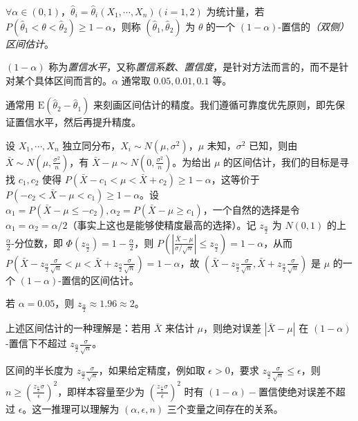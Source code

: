 \documentclass[../main.tex]{subfiles}
\begin{document}
\begin{definition}\label{def:6.4.1}
    $\forall\alpha\in(0,1)$，$\hat\theta_i=\hat\theta_i(X_1,\cdots,X_n)(i=1,2)$ 为统计量，若 $P(\hat\theta_1<\theta<\hat\theta_2)\geq1-\alpha$，则称 $(\hat\theta_1,\hat\theta_2)$ 为 $\theta$ 的一个 $(1-\alpha)$-置信的\emph{（双侧）区间估计}。
\end{definition}

$(1-\alpha)$ 称为\emph{置信水平}，又称\emph{置信系数}、\emph{置信度}，是针对方法而言的，而不是针对某个具体区间而言的。$\alpha$ 通常取 $0.05,0.01,0.1$ 等。

通常用 $\mathrm E(\hat\theta_2-\hat\theta_1)$ 来刻画区间估计的精度。我们遵循可靠度优先原则，即先保证置信水平，然后再提升精度。

\begin{example}
    设 $X_1,\cdots,X_n$ 独立同分布，$X_i\sim N(\mu,\sigma^2)$，$\mu$ 未知，$\sigma^2$ 已知，则由 $\bar X\sim N(\mu,\frac{\sigma^2}n)$，有 $\bar X-\mu\sim N(0,\frac{\sigma^2}n)$。为给出 $\mu$ 的区间估计，我们的目标是寻找 $c_1,c_2$ 使得 $P(\bar X-c_1<\mu<\bar X+c_2)\geq1-\alpha$，这等价于 $P(-c_2<\bar X-\mu<c_1)\geq1-\alpha$。设 $\alpha_1=P(\bar X-\mu\leq-c_2),\alpha_2=P(\bar X-\mu\geq c_1)$，一个自然的选择是令 $\alpha_1=\alpha_2=\alpha/2$（事实上这也是能够使精度最高的选择）。记 $z_{\frac\alpha2}$ 为 $N(0,1)$ 的上 $\frac\alpha2$-分位数，即 $\Phi(z_{\frac\alpha2})=1-\frac\alpha2$，则 $P(\left|\frac{\bar X-\mu}{\sigma/\sqrt n}\right|\leq z_{\frac\alpha2})=1-\alpha$，从而 $P(\bar X-z_{\frac\alpha2}\frac\sigma{\sqrt n}<\mu<\bar X+z_{\frac\alpha2}\frac\sigma{\sqrt n})=1-\alpha$，故 $(\bar X-z_{\frac\alpha2}\frac\sigma{\sqrt n},\bar X+z_{\frac\alpha2}\frac\sigma{\sqrt n})$ 是 $\mu$ 的一个 $(1-\alpha)$-置信的区间估计。
\end{example}

若 $\alpha=0.05$，则 $z_{\frac\alpha2}\approx1.96\approx2$。

上述区间估计的一种理解是：若用 $\bar X$ 来估计 $\mu$，则绝对误差 $|\bar X-\mu|$ 在 $(1-\alpha)$-置信下不超过 $z_{\frac\alpha2}\frac\sigma{\sqrt n}$。

区间的半长度为 $z_{\frac\alpha2}\frac\sigma{\sqrt n}$，如果给定精度，例如取 $\epsilon>0$，要求 $z_{\frac\alpha2}\frac\sigma{\sqrt n}\leq\epsilon$，则 $n\geq(\frac{z_{\frac\alpha2}\sigma}\epsilon)^2$，即样本容量至少为 $(\frac{z_{\frac\alpha2}\sigma}\epsilon)^2$ 时有 $(1-\alpha)-$置信使绝对误差不超过 $\epsilon$。这一推理可以理解为 $(\alpha,\epsilon,n)$ 三个变量之间存在的关系。
\end{document}
